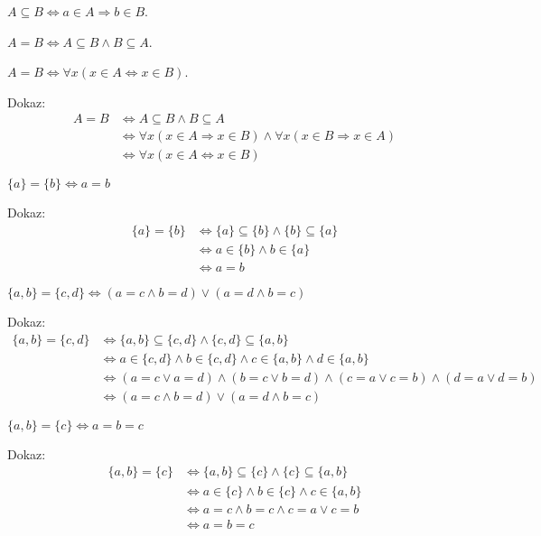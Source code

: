 \begin{definicija}
    $A \subseteq B \iff a \in A \Longrightarrow b \in B$.
\end{definicija}

\begin{definicija}
    $A = B \iff A \subseteq B \wedge B \subseteq A$.
\end{definicija}

\begin{trditev}
    $A = B \iff \forall x (x \in A \iff x \in B)$.
\end{trditev}
Dokaz:
\begin{align*}
    A = B &\iff A \subseteq B \wedge B \subseteq A \\
    &\iff \forall x (x \in A \Longrightarrow x \in B) \wedge \forall x (x \in B \Longrightarrow x \in A) \\
    &\iff \forall x (x \in A \iff x \in B)
\end{align*}

\begin{trditev}
    $\{a\} = \{b\} \iff a = b$
\end{trditev}
Dokaz:
\begin{align*}
    \{a\} = \{b\} &\iff \{a\} \subseteq \{b\} \wedge \{b\} \subseteq \{a\} \\
    &\iff a \in \{b\} \wedge b \in \{a\} \\
    &\iff a = b
\end{align*}

\begin{trditev}
    $\{a, b\} = \{c, d\} \iff (a = c \wedge b = d) \vee (a = d \wedge b = c)$
\end{trditev}
Dokaz:
\begin{align*}
    \{a, b\} = \{c, d\} &\iff \{a, b\} \subseteq \{c, d\} \wedge \{c, d\} \subseteq \{a, b\} \\
    &\iff a \in \{c, d\} \wedge b \in \{c, d\} \wedge c \in \{a, b\} \wedge d \in \{a, b\} \\
    &\iff (a = c \vee a = d) \wedge (b = c \vee b = d) \wedge (c = a \vee c = b) \wedge (d = a \vee d = b) \\
    &\iff (a = c \wedge b = d) \vee (a = d \wedge b = c)
\end{align*}

\begin{trditev}
    $\{a, b\} = \{c\} \iff a = b = c$
\end{trditev}
Dokaz:
\begin{align*}
    \{a, b\} = \{c\} &\iff \{a, b\} \subseteq \{c\} \wedge \{c\} \subseteq \{a, b\} \\
    &\iff a \in \{c\} \wedge b \in \{c\} \wedge c \in \{a, b\} \\
    &\iff a = c \wedge b = c \wedge c = a \vee c = b \\
    &\iff a = b = c
\end{align*}


